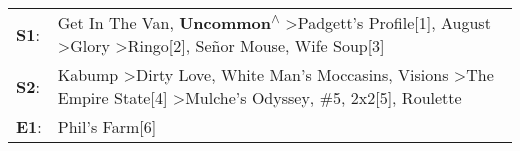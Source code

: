 \begin{supertabular}{p{0.03\textwidth}p{0.92\textwidth}}
 \textbf{S1}:  &                          Get In The Van\textsuperscript{}, \enspace \textbf{Uncommon\textsuperscript{$\wedge$}} \textgreater \enspace Padgett's Profile[1]\textsuperscript{}, \enspace August\textsuperscript{} \textgreater \enspace Glory\textsuperscript{} \textgreater \enspace Ringo[2]\textsuperscript{}, \enspace Señor Mouse\textsuperscript{}, \enspace Wife Soup[3]\textsuperscript{}  \enspace  \\
 \textbf{S2}:  &  Kabump\textsuperscript{} \textgreater \enspace Dirty Love\textsuperscript{}, \enspace White Man's Moccasins\textsuperscript{}, \enspace Visions\textsuperscript{} \textgreater \enspace The Empire State[4]\textsuperscript{} \textgreater \enspace Mulche's Odyssey\textsuperscript{}, \enspace \#5\textsuperscript{}, \enspace 2x2[5]\textsuperscript{}, \enspace Roulette\textsuperscript{}  \enspace  \\
 \textbf{E1}:  &                                                                                                                                                                                                                                                                                                                                                                Phil's Farm[6]\textsuperscript{}  \enspace  \\
\end{supertabular}

